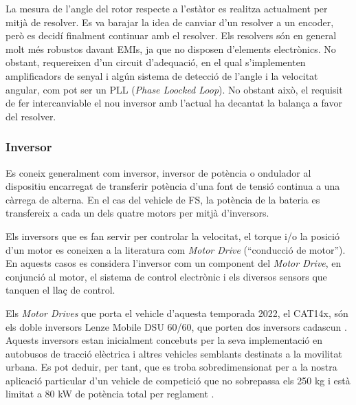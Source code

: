 {{        La mesura de l'angle del rotor respecte a l'estàtor es realitza
        actualment per mitjà de resolver. Es va barajar la idea de canviar d'un
        resolver a un encoder, però es decidí finalment continuar amb el
        resolver. Els resolvers són en general molt més robustos davant EMIs,
        ja que no disposen d'elements electrònics. No obstant, requereixen d'un
        circuit d'adequació, en el qual s'implementen amplificadors de senyal i
        algún sistema de detecció de l'angle i la velocitat angular, com
        pot ser un PLL (\emph{Phase Loocked Loop}). No obstant això, el
        requisit de fer intercanviable el nou inversor amb l'actual ha decantat
        la balança a favor del resolver.
    }

    \subsubsection{ Inversor }
    {
        Es coneix generalment com inversor, inversor de potència o ondulador al
        dispositiu encarregat de transferir potència d'una font de tensió
        continua a una càrrega de alterna. En el cas del vehicle de FS, la
        potència de la bateria es transfereix a cada un dels quatre motors per
        mitjà d'inversors.

        Els inversors que es fan servir per controlar la velocitat, el torque
        i/o la posició d'un motor es coneixen a la literatura com \emph{Motor
        Drive} (``conducció de motor''). En aquests casos es considera l'inversor
        com un component del \emph{Motor Drive}, en conjunció al motor, el
        sistema de control electrònic i els diversos sensors que tanquen el
        llaç de control.

        Els \emph{Motor Drives} que porta el vehicle d'aquesta temporada 2022,
        el CAT14x, són els doble inversors Lenze Mobile DSU 60/60, que porten
        dos inversors cadascun \cite{lenze}. Aquests inversors estan
        inicialment concebuts per la seva implementació en autobusos de tracció
        elèctrica i altres vehicles semblants destinats a la movilitat urbana.
        Es pot deduir, per tant, que es troba sobredimensionat per a la nostra
        aplicació particular d'un vehicle de competició que no sobrepassa els
        250 kg i està limitat a 80 kW de potència total per reglament
        \cite{fs_rules}.

}}
